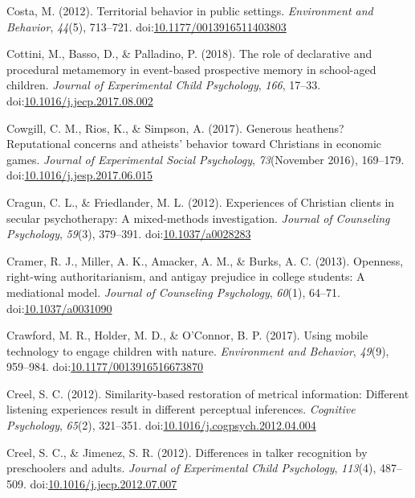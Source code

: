 \documentclass[english,man]{apa6}
\theoremstyle{definition}
\theoremstyle{definition}
\theoremstyle{definition}
\theoremstyle{remark}
\begin{document}
\hypertarget{ref-Costa2012}{}
Costa, M. (2012). Territorial behavior in public settings.
\emph{Environment and Behavior}, \emph{44}(5), 713--721.
doi:\href{https://doi.org/10.1177/0013916511403803}{10.1177/0013916511403803}

\hypertarget{ref-Cottini2018}{}
Cottini, M., Basso, D., \& Palladino, P. (2018). The role of declarative
and procedural metamemory in event-based prospective memory in
school-aged children. \emph{Journal of Experimental Child Psychology},
\emph{166}, 17--33.
doi:\href{https://doi.org/10.1016/j.jecp.2017.08.002}{10.1016/j.jecp.2017.08.002}

\hypertarget{ref-Cowgill2017}{}
Cowgill, C. M., Rios, K., \& Simpson, A. (2017). Generous heathens?
Reputational concerns and atheists' behavior toward Christians in
economic games. \emph{Journal of Experimental Social Psychology},
\emph{73}(November 2016), 169--179.
doi:\href{https://doi.org/10.1016/j.jesp.2017.06.015}{10.1016/j.jesp.2017.06.015}

\hypertarget{ref-Cragun2012}{}
Cragun, C. L., \& Friedlander, M. L. (2012). Experiences of Christian
clients in secular psychotherapy: A mixed-methods investigation.
\emph{Journal of Counseling Psychology}, \emph{59}(3), 379--391.
doi:\href{https://doi.org/10.1037/a0028283}{10.1037/a0028283}

\hypertarget{ref-Cramer2013}{}
Cramer, R. J., Miller, A. K., Amacker, A. M., \& Burks, A. C. (2013).
Openness, right-wing authoritarianism, and antigay prejudice in college
students: A mediational model. \emph{Journal of Counseling Psychology},
\emph{60}(1), 64--71.
doi:\href{https://doi.org/10.1037/a0031090}{10.1037/a0031090}

\hypertarget{ref-Crawford2017}{}
Crawford, M. R., Holder, M. D., \& O'Connor, B. P. (2017). Using mobile
technology to engage children with nature. \emph{Environment and
Behavior}, \emph{49}(9), 959--984.
doi:\href{https://doi.org/10.1177/0013916516673870}{10.1177/0013916516673870}

\hypertarget{ref-Creel2012a}{}
Creel, S. C. (2012). Similarity-based restoration of metrical
information: Different listening experiences result in different
perceptual inferences. \emph{Cognitive Psychology}, \emph{65}(2),
321--351.
doi:\href{https://doi.org/10.1016/j.cogpsych.2012.04.004}{10.1016/j.cogpsych.2012.04.004}

\hypertarget{ref-Creel2012}{}
Creel, S. C., \& Jimenez, S. R. (2012). Differences in talker
recognition by preschoolers and adults. \emph{Journal of Experimental
Child Psychology}, \emph{113}(4), 487--509.
doi:\href{https://doi.org/10.1016/j.jecp.2012.07.007}{10.1016/j.jecp.2012.07.007}
\end{document}

